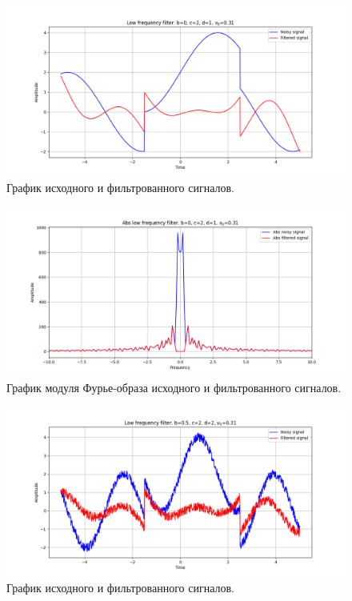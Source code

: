 \documentclass[a4paper, 12pt]{article}
\begin{document}
    \begin{figure}[!htb]
        \centering
        \includegraphics[scale=0.485]{16_u_flt_u_nolow.png}
        \captionsetup{skip=0pt}
        \caption{График исходного и фильтрованного сигналов.}
        \label{fig:fig57}
    \end{figure}
    \begin{figure}[!htb]
        \centering
        \includegraphics[scale=0.485]{16_abs_u_U_nolow.png}
        \captionsetup{skip=0pt}
        \caption{График модуля Фурье-образа исходного и фильтрованного сигналов.}
        \label{fig:fig58}
    \end{figure}
    \begin{figure}[!htb]
        \centering
        \includegraphics[scale=0.485]{17_u_flt_u_nolow.png}
        \captionsetup{skip=0pt}
        \caption{График исходного и фильтрованного сигналов.}
        \label{fig:fig59}
    \end{figure}
\end{document}
